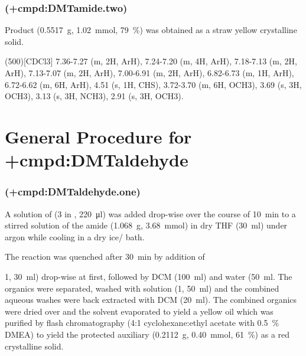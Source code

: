 {    \subsubsection{ (\cmpd+{cmpd:DMTamide.two})}

    Product  (\SI{0.5517}{\gram}, \SI{1.02}{\milli\mol}, \SI{79}{\percent}) was obtained as a straw yellow crystalline solid.

    \NMR(500)[CDCl3] 7.36-7.27 (m, 2H, ArH), 7.24-7.20 (m, 4H, ArH), 7.18-7.13 (m, 2H, ArH), 7.13-7.07 (m, 2H, ArH), 7.00-6.91 (m, 2H, ArH), 6.82-6.73 (m, 1H, ArH), 6.72-6.62 (m, 6H, ArH), 4.51 (s, 1H, CHS), 3.72-3.70 (m, 6H, OCH3), 3.69 (s, 3H, OCH3), 3.13 (s, 3H, NCH3), 2.91 (s, 3H, OCH3).



\section{General Procedure for \cmpd+{cmpd:DMTaldehyde}}

\subsubsection{ (\cmpd+{cmpd:DMTaldehyde.one})}

A solution of  (\SI{3}{\Molar} in , \SI{220}{\micro\litre}) was added drop-wise over the course of \SI{10}{\minute} to a stirred solution of the amide  (\SI{1.068}{\gram}, \SI{3.68}{\milli\mol}) in dry THF (\SI{30}{\milli\litre}) under argon while cooling in a dry ice/ bath.

The reaction was quenched after \SI{30}{\minute} by addition of  {\SI{1}{\Molar}, \SI{30}{\milli\litre}) drop-wise at first, followed by DCM (\SI{100}{\milli\litre}) and water (\SI{50}{\milli\litre}. The organics were separated, washed with  solution (\SI{1}{\Molar}, \SI{50}{\milli\litre}) and the combined aqueous washes were back extracted with DCM (\SI{20}{\milli\litre}). The combined organics were dried over  and the solvent evaporated \invacuo to yield a yellow oil which was purified by flash chromatography (4:1 cyclohexane:ethyl acetate with \SI{0.5}{\percent} DMEA) to yield the protected auxiliary  (\SI{0.2112}{\gram}, \SI{0.40}{\milli\mol}, \SI{61}{\percent}) as a red crystalline solid.

}}
